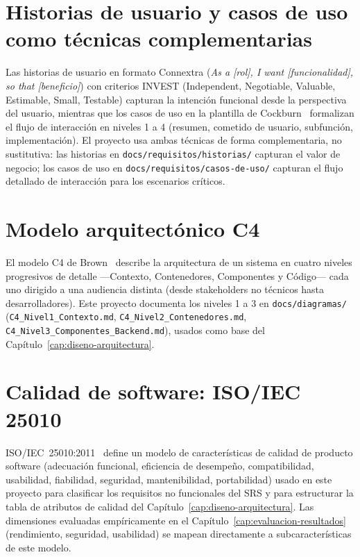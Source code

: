 \section{Historias de usuario y casos de uso como técnicas complementarias}

Las historias de usuario en formato Connextra (\emph{As a [rol], I want
[funcionalidad], so that [beneficio]}) con criterios INVEST (Independent,
Negotiable, Valuable, Estimable, Small, Testable) capturan la intención
funcional desde la perspectiva del usuario, mientras que los casos de uso
en la plantilla de Cockburn~\cite{COCKBURN2000} formalizan el flujo de
interacción en niveles 1 a 4 (resumen, cometido de usuario, subfunción,
implementación). El proyecto usa ambas técnicas de forma complementaria,
no sustitutiva: las historias en \texttt{docs/requisitos/historias/}
capturan el valor de negocio; los casos de uso en
\texttt{docs/requisitos/casos-de-uso/} capturan el flujo detallado de
interacción para los escenarios críticos.

\section{Modelo arquitectónico C4}

El modelo C4 de Brown~\cite{BROWN2018} describe la arquitectura de un
sistema en cuatro niveles progresivos de detalle ---Contexto, Contenedores,
Componentes y Código--- cada uno dirigido a una audiencia distinta (desde
stakeholders no técnicos hasta desarrolladores). Este proyecto documenta
los niveles 1 a 3 en \texttt{docs/diagramas/}
(\texttt{C4\_Nivel1\_Contexto.md}, \texttt{C4\_Nivel2\_Contenedores.md},
\texttt{C4\_Nivel3\_Componentes\_Backend.md}), usados como base del
Capítulo~\ref{cap:diseno-arquitectura}.

\section{Calidad de software: ISO/IEC 25010}

ISO/IEC~25010:2011~\cite{ISO25010} define un modelo de características de
calidad de producto software (adecuación funcional, eficiencia de
desempeño, compatibilidad, usabilidad, fiabilidad, seguridad,
mantenibilidad, portabilidad) usado en este proyecto para clasificar los
requisitos no funcionales del SRS y para estructurar la tabla de atributos
de calidad del Capítulo~\ref{cap:diseno-arquitectura}. Las dimensiones
evaluadas empíricamente en el Capítulo~\ref{cap:evaluacion-resultados}
(rendimiento, seguridad, usabilidad) se mapean directamente a
subcaracterísticas de este modelo.

